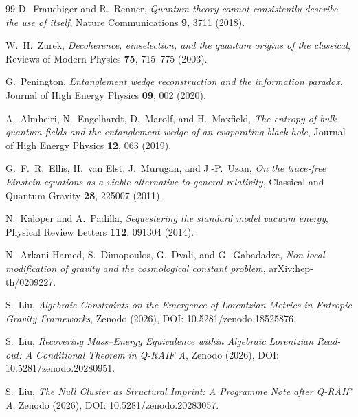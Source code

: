 \documentclass[12pt,a4paper]{article}
\theoremstyle{definition}
\theoremstyle{remark}
\begin{document}
\begin{thebibliography}{99}
D.~Frauchiger and R.~Renner, \emph{Quantum theory cannot consistently describe the use of itself}, Nature Communications \textbf{9}, 3711 (2018).

W.~H.~Zurek, \emph{Decoherence, einselection, and the quantum origins of the classical}, Reviews of Modern Physics \textbf{75}, 715--775 (2003).

G.~Penington, \emph{Entanglement wedge reconstruction and the information paradox}, Journal of High Energy Physics \textbf{09}, 002 (2020).

A.~Almheiri, N.~Engelhardt, D.~Marolf, and H.~Maxfield, \emph{The entropy of bulk quantum fields and the entanglement wedge of an evaporating black hole}, Journal of High Energy Physics \textbf{12}, 063 (2019).

G.~F.~R.~Ellis, H.~van Elst, J.~Murugan, and J.-P.~Uzan, \emph{On the trace-free Einstein equations as a viable alternative to general relativity}, Classical and Quantum Gravity \textbf{28}, 225007 (2011).

N.~Kaloper and A.~Padilla, \emph{Sequestering the standard model vacuum energy}, Physical Review Letters \textbf{112}, 091304 (2014).

N.~Arkani-Hamed, S.~Dimopoulos, G.~Dvali, and G.~Gabadadze, \emph{Non-local modification of gravity and the cosmological constant problem}, arXiv:hep-th/0209227.

S.~Liu, \emph{Algebraic Constraints on the Emergence of Lorentzian Metrics in Entropic Gravity Frameworks}, Zenodo (2026), DOI: 10.5281/zenodo.18525876.

S.~Liu, \emph{Recovering Mass--Energy Equivalence within Algebraic Lorentzian Read-out: A Conditional Theorem in Q-RAIF A}, Zenodo (2026), DOI: 10.5281/zenodo.20280951.

S.~Liu, \emph{The Null Cluster as Structural Imprint: A Programme Note after Q-RAIF A}, Zenodo (2026), DOI: 10.5281/zenodo.20283057.

\end{thebibliography}
\end{document}
